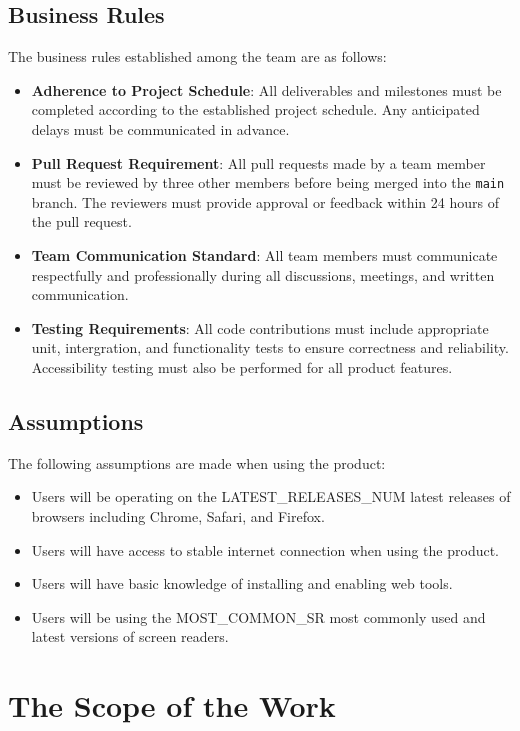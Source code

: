 \documentclass[12pt]{article}
\begin{document}
\subsection{Business Rules}
The business rules established among the team are as follows:
\begin{itemize}
  \item \textbf{Adherence to Project Schedule}: All deliverables and
    milestones must be
    completed according to the established project schedule. Any
    anticipated delays must be communicated
    in advance.
  \item \textbf{Pull Request Requirement}: All pull requests made by
    a team member must be reviewed by
    three other members before being merged into the \texttt{main}
    branch. The reviewers must provide approval
    or feedback within 24 hours of the pull request.
  \item \textbf{Team Communication Standard}: All team members must
    communicate respectfully and professionally during
    all discussions, meetings, and written communication.
  \item \textbf{Testing Requirements}: All code contributions must
    include appropriate unit, intergration, and
    functionality tests to ensure correctness and reliability.
    Accessibility testing must also be performed for all
    product features.
\end{itemize}
\subsection{Assumptions}
The following assumptions are made when using the product:
\begin{itemize}
  \item Users will be operating on the LATEST\_RELEASES\_NUM latest releases of
    browsers including Chrome, Safari, and Firefox.
  \item Users will have access to stable internet connection when
    using the product.
  \item Users will have basic knowledge of installing and enabling web tools.
  \item Users will be using the MOST\_COMMON\_SR most commonly used and latest
    versions of screen readers.
\end{itemize}
\section{The Scope of the Work}
\end{document}
